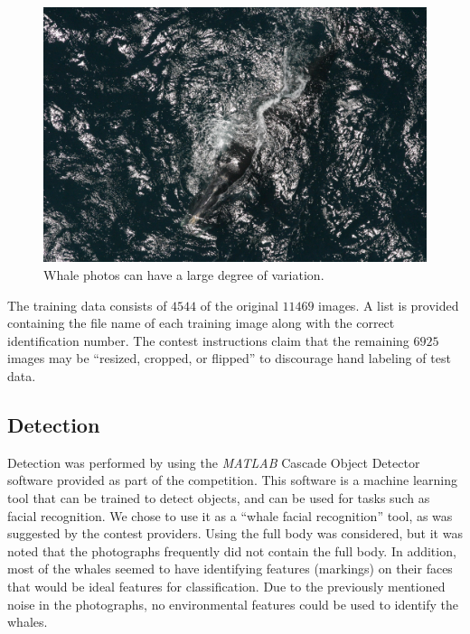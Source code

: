 \documentclass[10pt]{IEEEtran}
\newcommand{\?}{\stackrel{?}{=}}
\begin{document}
\begin{figure}[H]
\begin{center}
\captionsetup{justification=centering}
\includegraphics[scale=.06]{whale2.png}
\caption{Whale photos can have a large degree of variation.}
\label{whale2}
\end{center}
\end{figure} 

The training data consists of $4544$ of the original $11469$ images. A list is 
provided containing the file name of each training image along with the 
correct identification number. The contest instructions claim that the
remaining $6925$ images may be ``resized, cropped, or flipped'' to discourage
hand labeling of test data\cite{kaggle_data}. 
~
\subsection{Detection}
Detection was performed by using the \textit{MATLAB} Cascade Object Detector 
software provided as part of the competition\cite{kaggle_face}\cite{math_cascade}. 
This software is a machine learning tool that can be trained to detect objects,
and can be used for tasks such as facial recognition. We chose to use it as 
a ``whale facial recognition'' tool, as was suggested by the contest 
providers\cite{kaggle_face}. Using the full body was considered, but it was 
noted that the photographs frequently did not contain the full body. In addition,
most of the whales seemed to have identifying features (markings) on their faces
that would be ideal features for classification. Due to the previously mentioned
noise in the photographs, no environmental features could be used to identify
the whales.
\end{document}
